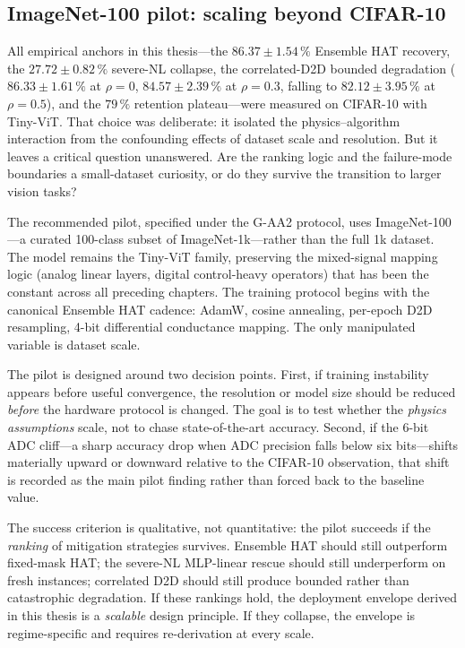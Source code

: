 \subsection{ImageNet-100 pilot: scaling beyond CIFAR-10}
\label{subsec:imagenet-pilot}

All empirical anchors in this thesis---the $86.37\pm1.54\,\%$ Ensemble HAT recovery, the $27.72\pm0.82\,\%$ severe-NL collapse, the correlated-D2D bounded degradation ($86.33\pm1.61\,\%$ at $\rho=0$, $84.57\pm2.39\,\%$ at $\rho=0.3$, falling to $82.12\pm3.95\,\%$ at $\rho=0.5$), and the $79\,\%$ retention plateau---were measured on CIFAR-10 with Tiny-ViT.  That choice was deliberate: it isolated the physics--algorithm interaction from the confounding effects of dataset scale and resolution.  But it leaves a critical question unanswered.  Are the ranking logic and the failure-mode boundaries a small-dataset curiosity, or do they survive the transition to larger vision tasks?

The recommended pilot, specified under the G-AA2 protocol, uses ImageNet-100---a curated 100-class subset of ImageNet-1k---rather than the full 1k dataset.  The model remains the Tiny-ViT family, preserving the mixed-signal mapping logic (analog linear layers, digital control-heavy operators) that has been the constant across all preceding chapters.  The training protocol begins with the canonical Ensemble HAT cadence: AdamW, cosine annealing, per-epoch D2D resampling, 4-bit differential conductance mapping.  The only manipulated variable is dataset scale.

The pilot is designed around two decision points.  First, if training instability appears before useful convergence, the resolution or model size should be reduced \emph{before} the hardware protocol is changed.  The goal is to test whether the \emph{physics assumptions} scale, not to chase state-of-the-art accuracy.  Second, if the 6-bit ADC cliff---a sharp accuracy drop when ADC precision falls below six bits---shifts materially upward or downward relative to the CIFAR-10 observation, that shift is recorded as the main pilot finding rather than forced back to the baseline value.

The success criterion is qualitative, not quantitative: the pilot succeeds if the \emph{ranking} of mitigation strategies survives.  Ensemble HAT should still outperform fixed-mask HAT; the severe-NL MLP-linear rescue should still underperform on fresh instances; correlated D2D should still produce bounded rather than catastrophic degradation.  If these rankings hold, the deployment envelope derived in this thesis is a \emph{scalable} design principle.  If they collapse, the envelope is regime-specific and requires re-derivation at every scale.


